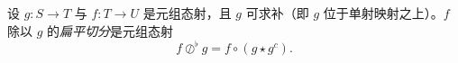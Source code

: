 



\begin{definition}
    设 $g: S \to T$ 与 $f:T \to U$ 是元组态射，且 $g$ 可求补（即 $g$ 位于单射映射之上）。$f$ 除以 $g$ 的{\it 扁平切分}是元组态射
    \[
    f \oslash^\flat g = f \circ (g \star g^c).
    \]
\end{definition}


